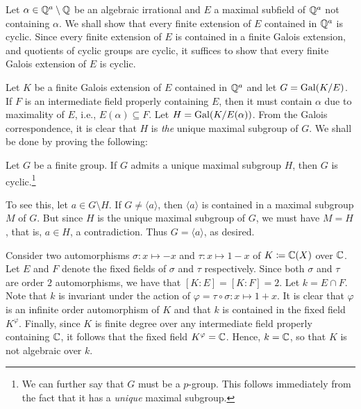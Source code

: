 \begin{exercise}
    Let $\alpha\in\mathbb{Q}^a\setminus\mathbb{Q}$ be an algebraic irrational and $E$ a maximal subfield of $\mathbb{Q}^a$ not containing $\alpha$. We shall show that every finite extension of $E$ contained in $\mathbb{Q}^a$ is cyclic. Since every finite extension of $E$ is contained in a finite Galois extension, and quotients of cyclic groups are cyclic, it suffices to show that every finite Galois extension of $E$ is cyclic.

    Let $K$ be a finite Galois extension of $E$ contained in $\mathbb{Q}^a$ and let $G =\operatorname{Gal}(K/E)$. If $F$ is an intermediate field properly containing $E$, then it must contain $\alpha$ due to maximality of $E$, i.e., $E(\alpha)\subseteq F$. Let $H = \operatorname{Gal}(K/E(\alpha))$. From the Galois correspondence, it is clear that $H$ is \emph{the} unique maximal subgroup of $G$. We shall be done by proving the following:

    \begin{claim}
        Let $G$ be a finite group. If $G$ admits a unique maximal subgroup $H$, then $G$ is cyclic.\footnote{We can further say that $G$ must be a $p$-group. This follows immediately from the fact that it has a \emph{unique} maximal subgroup.}
    \end{claim}
    To see this, let $a\in G\setminus H$. If $G\ne\langle a\rangle$, then $\langle a\rangle$ is contained in a maximal subgroup $M$ of $G$. But since $H$ is the unique maximal subgroup of $G$, we must have $M = H$, that is, $a\in H$, a contradiction. Thus $G = \langle a\rangle$, as desired. 
\end{exercise}

\begin{exercise}

\end{exercise}

\setcounter{exercise}{33}

\begin{exercise}
    Consider two automorphisms $\sigma\colon x\mapsto -x$ and $\tau\colon x\mapsto 1 - x$ of $K\coloneq\mathbb{C}(X)$ over $\mathbb{C}$. Let $E$ and $F$ denote the fixed fields of $\sigma$ and $\tau$ respectively. Since both $\sigma$ and $\tau$ are order $2$ automorphisms, we have that $[K : E] = [K : F] = 2$. Let $k = E\cap F$. Note that $k$ is invariant under the action of $\varphi = \tau\circ\sigma\colon x\mapsto 1 + x$. It is clear that $\varphi$ is an infinite order automorphism of $K$ and that $k$ is contained in the fixed field $K^{\varphi}$. Finally, since $K$ is finite degree over any intermediate field properly containing $\mathbb{C}$, it follows that the fixed field $K^\varphi = \mathbb{C}$. Hence, $k = \mathbb{C}$, so that $K$ is not algebraic over $k$.
\end{exercise}